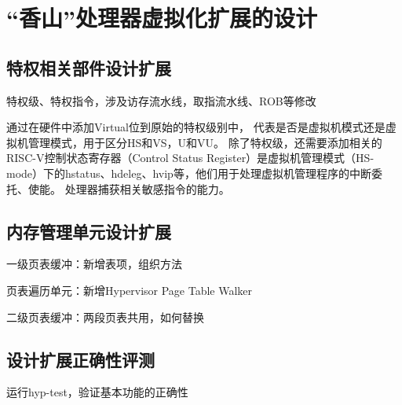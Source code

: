 \chapter{“香山”处理器虚拟化扩展的设计}

\section{特权相关部件设计扩展}
特权级、特权指令，涉及访存流水线，取指流水线、ROB等修改

通过在硬件中添加Virtual位到原始的特权级别中，
代表是否是虚拟机模式还是虚拟机管理模式，用于区分HS和VS，U和VU。
除了特权级，还需要添加相关的RISC-V控制状态寄存器（Control Status Register）是虚拟机管理模式（HS-mode）下的hstatus、hdeleg、hvip等，他们用于处理虚拟机管理程序的中断委托、使能。
处理器捕获相关敏感指令的能力。

\section{内存管理单元设计扩展}

一级页表缓冲：新增表项，组织方法

页表遍历单元：新增Hypervisor Page Table Walker

二级页表缓冲：两段页表共用，如何替换

\section{设计扩展正确性评测}

运行hyp-test，验证基本功能的正确性